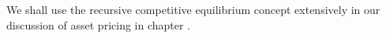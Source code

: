 

We shall use the recursive competitive equilibrium concept
extensively in our discussion of asset pricing in chapter .







